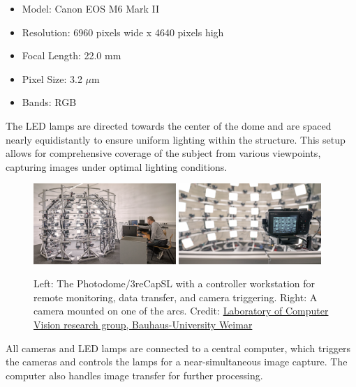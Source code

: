 \begin{itemize}[noitemsep]
	\item Model: Canon EOS M6 Mark II
	\item Resolution: 6960 pixels wide x 4640 pixels high
	\item Focal Length: 22.0 mm
	\item Pixel Size: 3.2 $\mu$m
	\item Bands: RGB
\end{itemize}

The LED lamps are directed towards the center of the dome and are spaced nearly equidistantly to ensure uniform lighting within the structure. This setup allows for comprehensive coverage of the subject from various viewpoints, capturing images under optimal lighting conditions.

\begin{figure}[H]
	\centering
	\includegraphics[width=0.48\textwidth]{Figures/methods/CV-Lab-Dom.png}
	\includegraphics[width=0.48\textwidth]{Figures/methods/CV-Lab-Dom-Detail.png}
	\caption{Left: The Photodome/3reCapSL with a controller workstation for remote monitoring, data transfer, and camera triggering. Right: A camera mounted on one of the arcs. Credit: \href{https://www.uni-weimar.de/de/medien/professuren/medieninformatik/computer-vision/forschung/computer-vision-labor/c65966}{Laboratory of Computer Vision research group, Bauhaus-University Weimar}}
	\label{fig:Photodome}
\end{figure}

All cameras and LED lamps are connected to a central computer, which triggers the cameras and controls the lamps for a near-simultaneous image capture. The computer also handles image transfer for further processing. 


